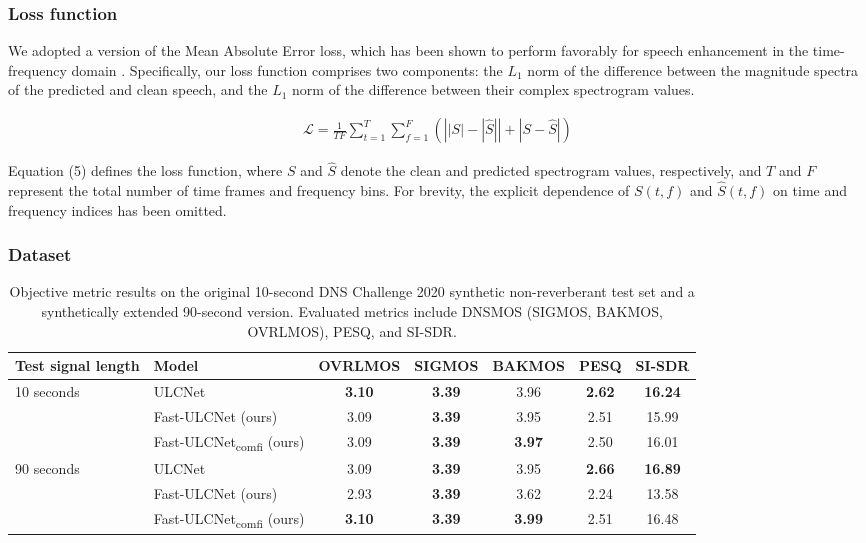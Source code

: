 \documentclass[9pt]{article}
\begin{document}
\subsubsection{Loss function}
\label{sssec:loss}
We adopted a version of the Mean Absolute Error loss, which has been shown to perform favorably for speech enhancement in the time-frequency domain \cite{C11}. Specifically, our loss function comprises two components: the $L_1$ norm of the difference between the magnitude spectra of the predicted and clean speech, and the $L_1$ norm of the difference between their complex spectrogram values.

\begin{align}
\mathcal{L} = \frac{1}{T F} \sum_{t=1}^{T} \sum_{f=1}^{F} \left( \left| |S| - |\hat{S}| \right| + \left| S - \hat{S} \right| \right)
\end{align}

Equation (5) defines the loss function, where $S$ and $\hat{S}$ denote the clean and predicted spectrogram values, respectively, and $T$ and $F$ represent the total number of time frames and frequency bins. For brevity, the explicit dependence of  $S(t, f)$ and $\hat{S}(t, f)$ on time and frequency indices has been omitted.

\subsubsection{Dataset}
\label{sssec:dataset}

\begin{table}[ht]
\centering
\caption{Objective metric results on the original 10-second DNS Challenge 2020 synthetic non-reverberant test set and a synthetically extended 90-second version. Evaluated metrics include DNSMOS (SIGMOS, BAKMOS, OVRLMOS), PESQ, and SI-SDR.}
\label{tab:model_performance}
\begin{tabular}{llccccc}
\hline
\textbf{Test signal length} & \textbf{Model} & \textbf{OVRLMOS} & \textbf{SIGMOS} & \textbf{BAKMOS} & \textbf{PESQ} & \textbf{SI-SDR} \\
\hline
\multirow{3}{*}{10 seconds} & ULCNet & \textbf{3.10} & \textbf{3.39} & 3.96 & \textbf{2.62} & \textbf{16.24} \\ %
                       & Fast-ULCNet (ours) & 3.09 & \textbf{3.39} & 3.95 & 2.51 & 15.99 \\ %
                       & Fast-ULCNet\textsubscript{comfi} (ours) & 3.09 & \textbf{3.39} & \textbf{3.97} & 2.50 & 16.01 \\ \hline
                       
\multirow{3}{*}{90 seconds} & ULCNet & 3.09 & \textbf{3.39} & 3.95 & \textbf{2.66} & \textbf{16.89} \\ %
                       & Fast-ULCNet (ours) & 2.93 & \textbf{3.39} & 3.62 & 2.24 & 13.58 \\ %
                       & Fast-ULCNet\textsubscript{comfi} (ours) & \textbf{3.10} & \textbf{3.39} & \textbf{3.99} & 2.51 & 16.48 \\ \hline
\end{tabular}
\end{table}
\end{document}

